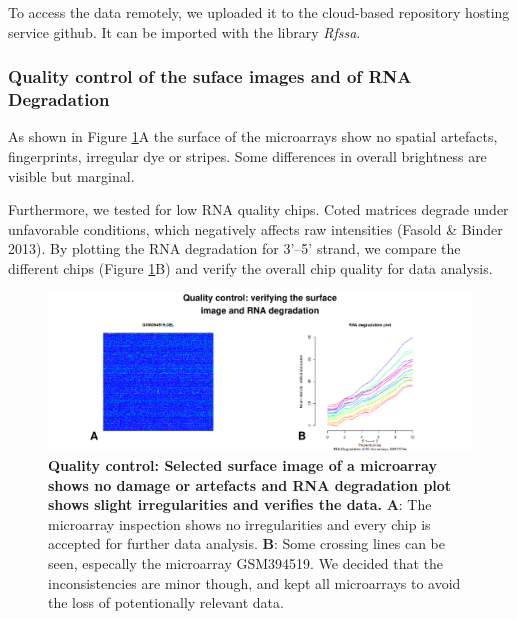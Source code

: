 \documentclass[
]{article}
\begin{document}
To access the data remotely, we uploaded it to the cloud-based repository hosting service github. It can be imported with the library \emph{Rfssa}.

\hypertarget{quality-control-of-the-suface-images-and-of-rna-degradation}{%
\subsubsection{Quality control of the suface images and of RNA Degradation}\label{quality-control-of-the-suface-images-and-of-rna-degradation}}

As shown in Figure \ref{fig:QC-surface-images-and-RNA-Degradation-Plot}A the surface of the microarrays show no spatial artefacts, fingerprints, irregular dye or stripes. Some differences in overall brightness are visible but marginal.

Furthermore, we tested for low RNA quality chips. Coted matrices degrade under unfavorable conditions, which negatively affects raw intensities (Fasold \& Binder 2013). By plotting the RNA degradation for 3'--5' strand, we compare the different chips (Figure \ref{fig:QC-surface-images-and-RNA-Degradation-Plot}B) and verify the overall chip quality for data analysis.

\begin{figure}
\centering
\includegraphics{final_report_files/figure-latex/QC-surface-images-and-RNA-Degradation-Plot-1.pdf}
\caption{\label{fig:QC-surface-images-and-RNA-Degradation-Plot}\textbf{Quality control: Selected surface image of a microarray shows no damage or artefacts and RNA degradation plot shows slight irregularities and verifies the data.} \textbf{A}: The microarray inspection shows no irregularities and every chip is accepted for further data analysis. \textbf{B}: Some crossing lines can be seen, especally the microarray GSM394519. We decided that the inconsistencies are minor though, and kept all microarrays to avoid the loss of potentionally relevant data.}
\end{figure}
\end{document}
